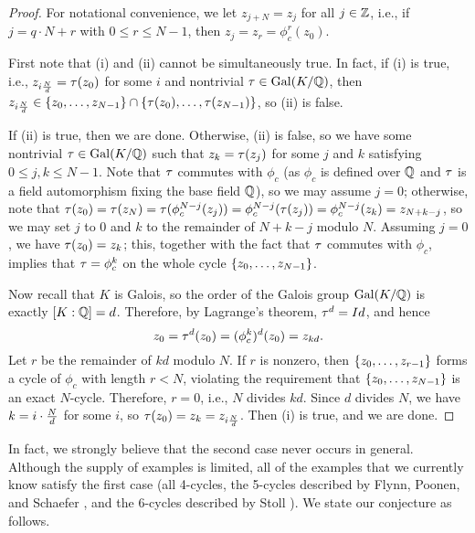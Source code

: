 %
%
%
\begin{proof}
  For notational convenience, we let $z_{j+N} = z_j$ for all $j \in
  \mathbb{Z}$, i.e., if $j = q \cdot N + r$ with $0 \le r \le N-1$, then $z_j
  = z_r = \phi_c^r(z_0)$.

  First note that (i) and (ii) cannot be simultaneously true. In fact,
  if (i) is true, i.e., $z_{i\frac{N}{d}} = \tau(z_0)$ for some $i$ and
  nontrivial $\tau \in \mathrm{Gal}(K/\mathbb{Q})$, then $z_{i\frac{N}{d}} \in \left\{z_0, \dots,
    z_{N-1}\right\} \cap \left\{\tau(z_0), \dots, \tau(z_{N-1})\right\}$, so (ii) is
  false.

  If (ii) is true, then we are done. Otherwise, (ii) is false, so we
  have some nontrivial $\tau \in \mathrm{Gal}(K/\mathbb{Q})$ such that $z_k = \tau(z_j)$
  for some $j$ and $k$ satisfying $0 \le j, k \le N-1$. Note that $\tau$
  commutes with $\phi_c$ (as $\phi_c$ is defined over $\mathbb{Q}$ and $\tau$ is
  a field automorphism fixing the base field $\mathbb{Q}$), so we may assume
  $j = 0$; otherwise, note that $\tau(z_0) = \tau(z_N) =
  \tau(\phi_c^{N-j}(z_j)) = \phi_c^{N-j}(\tau(z_j)) = \phi_c^{N-j}(z_k) =
  z_{N+k-j}$, so we may set $j$ to 0 and $k$ to the remainder of
  $N+k-j$ modulo $N$. Assuming $j = 0$, we have $\tau(z_0) = z_k$; this,
  together with the fact that $\tau$ commutes with $\phi_c$, implies
  that $\tau = \phi_c^k$ on the whole cycle $\left\{z_0, \dots, z_{N-1}\right\}$.

  Now recall that $K$ is Galois, so the order of the Galois group
  $\mathrm{Gal}(K/\mathbb{Q})$ is exactly $[K : \mathbb{Q}] = d$. Therefore, by Lagrange's
  theorem, $\tau^d = Id$, and hence
  \[
  z_0 = \tau^d(z_0) = (\phi_c^k)^d(z_0) = z_{kd}.
  \]
  Let $r$ be the remainder of $kd$ modulo $N$. If $r$ is nonzero, then
  $\left\{z_0, \dots, z_{r-1}\right\}$ forms a cycle of $\phi_c$ with length $r
  < N$, violating the requirement that $\left\{z_0, \dots, z_{N-1}\right\}$ is
  an exact $N$-cycle. Therefore, $r = 0$, i.e., $N$ divides
  $kd$. Since $d$ divides $N$, we have $k = i \cdot \frac{N}{d}$ for some $i$,
  so $\tau(z_0) = z_k = z_{i\frac{N}{d}}$. Then (i) is true, and we are done.
\end{proof}

In fact, we strongly believe that the second case never occurs in
general. Although the supply of examples is limited, all of the
examples that we currently know satisfy the first case (all 4-cycles,
the 5-cycles described by Flynn, Poonen, and Schaefer
\cite{MR1480542}, and the 6-cycles described by Stoll
\cite{MR2465796}). We state our conjecture as follows.

